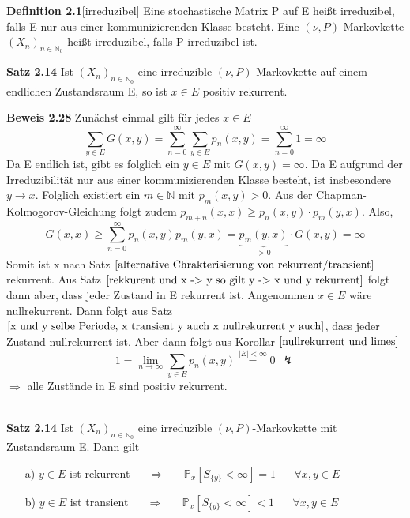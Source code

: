 \textbf{Definition 2.1}[irreduzibel]
Eine stochastische Matrix P auf E heißt irreduzibel, falls E nur aus einer kommunizierenden Klasse besteht. Eine $(\nu,P)$-Markovkette $(X_{n})_{n \in \mathbb{N}_{0}}$ heißt irreduzibel, falls P irreduzibel ist.

\textbf{Satz 2.14}
\label{irr. Markovkette x positiv rekurrent}
Ist $(X_{n})_{n \in \mathbb{N}_{0}}$ eine irreduzible $(\nu,P)$-Markovkette auf einem endlichen Zustandsraum E, so ist $x \in E$ positiv rekurrent.

\textbf{Beweis 2.28}
Zunächst einmal gilt für jedes $x \in E$
\begin{equation*}
\sum_{y \in E}G(x,y) = \sum_{n=0}^{\infty} \sum_{y \in E} p_{n}(x,y) = \sum_{n=0}^{\infty} 1 = \infty
\end{equation*}
Da E endlich ist, gibt es folglich ein $y \in E$ mit $G(x,y) = \infty$. Da E aufgrund der Irreduzibilität nur aus einer kommunizierenden Klasse besteht, ist insbesondere $y \rightarrow x$. Folglich existiert ein $m \in \mathbb{N}$ mit $p_{m}(x,y)>0$. Aus der Chapman-Kolmogorov-Gleichung folgt zudem $p_{m+n}(x,x) \geq p_{n}(x,y) \cdot p_{m}(y,x)$. Also,
\begin{equation*}
G(x,x) \geq \sum_{n=0}^{\infty} p_{n}(x,y)p_{m}(y,x) = \underbrace{p_{m}(y,x)}_{>0} \cdot G(x,y) = \infty
\end{equation*}
Somit ist x nach Satz $\ref{alternative Chrakterisierung von rekurrent/transient}$ rekurrent. Aus Satz $\ref{rekkurent und x -> y so gilt y -> x und y rekurrent}$ folgt dann aber, dass jeder Zustand in E rekurrent ist. Angenommen $x \in E$ wäre nullrekurrent. Dann folgt aus Satz $\ref{x und y selbe Periode, x transient y auch x nullrekurrent y auch}$, dass jeder Zustand nullrekurrent ist. Aber dann folgt aus Korollar $\ref{nullrekurrent und limes}$
\begin{equation*}
1 = \lim_{n \to \infty} \sum_{y \in E} p_{n}(x,y) \stackrel{\vert E \vert < \infty}{=} 0 \: \: \lightning 
\end{equation*}
$\Rightarrow$ alle Zustände in E sind positiv rekurrent.  

\mbox{}
\\
\textbf{Satz 2.14}
\label{irreduzibel, y rekurrent -> Px=1 , y transient -> Px<1 }
Ist $(X_{n})_{n \in \mathbb{N}_{0}}$ eine irreduzible $(\nu,P)$-Markovkette mit Zustandsraum E. Dann gilt
\begin{itemize}
\item[a)]$y \in E$ ist rekurrent $\quad$ $\Rightarrow$ $\quad$ $\mathbb{P}_{x}[S_{\lbrace y \rbrace} < \infty] = 1$ $\quad$ $\forall x,y \in E$ 
\item[b)]$y \in E$ ist transient $\quad$ $\Rightarrow$ $\quad$ $\mathbb{P}_{x}[S_{\lbrace y \rbrace} < \infty] < 1$ $\quad$ $\forall x,y \in E$  
\end{itemize}

